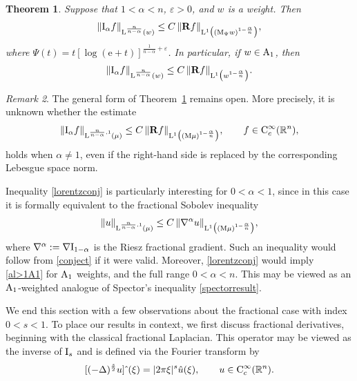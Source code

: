 \documentclass[11pt, a4paper, reqno]{amsart}
\newcommand{\R}{\mathbb R}
\newcommand{\A}{\textup A}
\newcommand{\al}{\alpha}
\newcommand{\Lup}{\textup{L}}
\newcommand{\Con}{\textup{C}}
\newtheorem{theorem}{Theorem}[section]
\theoremstyle{definition}
\theoremstyle{remark}
\newtheorem{remark}[theorem]{Remark}
\begin{document}
\begin{theorem}\label{al>1endpt}
Suppose that $1<\alpha<n$, $\varepsilon>0$, and $w$ is a weight. Then
\begin{equation*}\label{al>1bump}
\|\textup{I}_\alpha f\|_{\Lup^{\frac{n}{n-\alpha}}(w)}
\leq
C\,\|\mathbf R f\|_{\Lup^1\big((\textup{M}_\Psi w)^{1-\frac{\alpha}{n}}\big)},
\end{equation*}
where $\Psi(t)=t[\log(\mathrm e+t)]^{\frac{1}{n-\alpha}+\varepsilon}$. In particular, if $w\in \A_1$, then
\begin{equation}\label{al>1A1}
\|\textup{I}_\alpha f\|_{\Lup^{\frac{n}{n-\alpha}}(w)}
\leq
C\,\|\mathbf R f\|_{\Lup^1\big(w^{1-\frac{\alpha}{n}}\big)}.
\end{equation}
\end{theorem}

\begin{remark}
The general form of Theorem~\ref{al>1endpt} remains open. More precisely, it is unknown whether the estimate
\begin{equation}\label{lorentzconj}
\|\textup{I}_\alpha f\|_{\Lup^{\frac{n}{n-\alpha},1}(\mu)}
\leq
C\,\|\mathbf R f\|_{\Lup^1\big((\textup M\mu)^{1-\frac{\alpha}{n}}\big)},
\qquad f\in \Con_c^\infty(\R^n),
\end{equation}
holds when $\al\neq1$, even if the right-hand side is replaced by the corresponding Lebesgue space norm.

Inequality \eqref{lorentzconj} is particularly interesting for $0<\alpha<1$, since in this case it is formally equivalent to the fractional Sobolev inequality
\begin{equation}\label{fracSobconj}
\|u\|_{\Lup^{\frac{n}{n-\alpha},1}(\mu)} \le C\,\|\nabla^\alpha u\|_{\Lup^1\big((\textup M\mu)^{1-\frac{\alpha}{n}}\big)},
\end{equation}
where $\nabla^\alpha := \nabla \textup{I}_{1-\alpha}$ is the Riesz fractional gradient. Such an inequality would follow from \eqref{conject} if it were valid. Moreover, \eqref{lorentzconj} would imply \eqref{al>1A1} for $\A_1$ weights, and the full range $0<\alpha<n$. This may be viewed as an $\A_1$-weighted analogue of Spector’s inequality \eqref{spectorresult}.
\end{remark}

We end {this section} with a few observations about the fractional case with index $0<s<1$. To place our results in context, we first discuss fractional derivatives, beginning with the classical fractional Laplacian. This operator may be viewed as the inverse of $\textup I_s$ and is defined via the Fourier transform by 
\begin{equation*}\label{fracderiv} 
[(-\Delta)^{\frac{s}{2}}u]\hat{\ }(\xi)=|2\pi \xi|^s \hat{u}(\xi),\qquad u\in \Con_c^\infty(\R^n). 
\end{equation*} 
\end{document}
